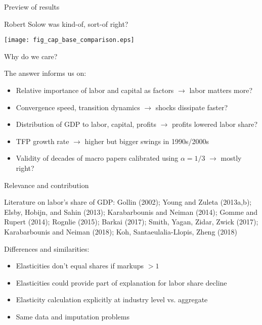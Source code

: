 \documentclass[10pt,xcolor=dvipsnames]{beamer}
\begin{document}
\begin{frame}{Preview of results}

Robert Solow was kind-of, sort-of right?

\begin{center}
\texttt{[image: fig\_cap\_base\_comparison.eps]}
\end{center}

\end{frame}

\begin{frame}{Why do we care?}

The answer informs us on:
\begin{itemize}
  \item Relative importance of labor and capital as factors $\rightarrow$ labor matters more?
  \item Convergence speed, transition dynamics $\rightarrow$ shocks dissipate faster?
  \item Distribution of GDP to labor, capital, profits $\rightarrow$ profits lowered labor share?
  \item TFP growth rate $\rightarrow$ higher but bigger swings in 1990s/2000s
  \item Validity of decades of macro papers calibrated using $\alpha = 1/3$ $\rightarrow$ mostly right?
\end{itemize}

\end{frame}

\begin{frame}{Relevance and contribution}

Literature on labor's share of GDP: Gollin (2002); Young and Zuleta (2013a,b); Elsby, Hobijn, and Sahin (2013); Karabarbounis and Neiman (2014); Gomme and Rupert (2014); Rognlie (2015); Barkai (2017); Smith, Yagan, Zidar, Zwick (2017); Karabarbounis and Neiman (2018); Koh, Santaeulalia-Llopis, Zheng (2018)

\vspace{.25in}
Differences and similarities:
\begin{itemize}
  \item Elasticities don't equal shares if markups $>1$
  \item Elasticities could provide part of explanation for labor share decline
  \item Elasticity calculation explicitly at industry level vs. aggregate
  \item Same data and imputation problems
\end{itemize}

\end{frame}
\end{document}
